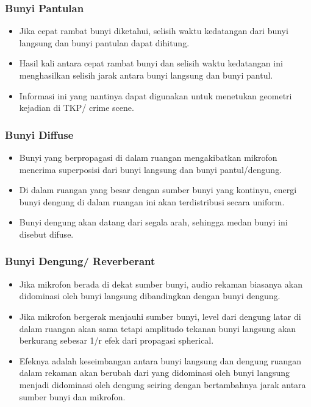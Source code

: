 \documentclass[pdflatex,compress]{beamer}
\begin{document}
\begin{frame}
	\frametitle{Bunyi Pantulan}
	\begin{itemize}
		\item Jika cepat rambat bunyi diketahui, selisih waktu kedatangan dari bunyi langsung dan bunyi pantulan dapat dihitung.
		\item Hasil kali antara cepat rambat bunyi dan selisih waktu kedatangan ini menghasilkan selisih jarak antara bunyi langsung dan bunyi pantul.
		\item Informasi ini yang nantinya dapat digunakan untuk menetukan geometri kejadian di TKP/ crime scene.
	\end{itemize}
\end{frame}

\begin{frame}
	\frametitle{Bunyi Diffuse}
	\begin{itemize}
		\item Bunyi yang berpropagasi di dalam ruangan mengakibatkan mikrofon menerima superposisi dari bunyi langsung dan bunyi pantul/dengung.
		\item Di dalam ruangan yang besar dengan sumber bunyi yang kontinyu, energi bunyi dengung di dalam ruangan ini akan terdistribusi secara uniform.
		\item Bunyi dengung akan datang dari segala arah, sehingga medan bunyi ini disebut difuse.
	\end{itemize}
\end{frame}

\begin{frame}
	\frametitle{Bunyi Dengung/ Reverberant}
	\begin{itemize}
		\item Jika mikrofon berada di dekat sumber bunyi, audio rekaman biasanya akan didominasi oleh bunyi langsung dibandingkan dengan bunyi dengung.
		\item Jika mikrofon bergerak menjauhi sumber bunyi, level dari dengung latar di dalam ruangan akan sama tetapi amplitudo tekanan bunyi langsung akan berkurang sebesar 1/r efek dari propagasi spherical.
		\item Efeknya adalah keseimbangan antara bunyi langsung dan dengung ruangan dalam rekaman akan berubah dari yang didominasi oleh bunyi langsung menjadi didominasi oleh dengung seiring dengan bertambahnya jarak antara sumber bunyi dan mikrofon.
	\end{itemize}
\end{frame}
\end{document}

